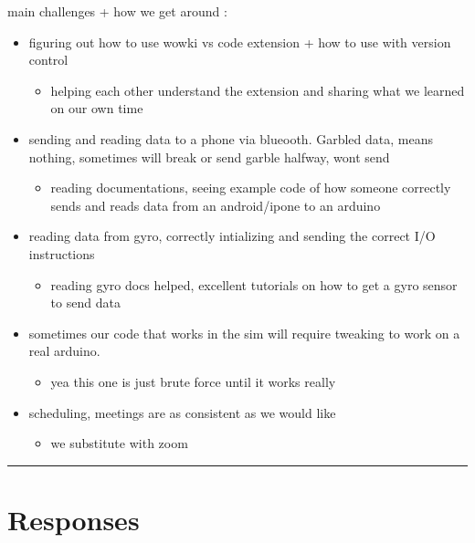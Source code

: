 \documentclass[12pt]{article}
\begin{document}
main challenges + how we get around :
\begin{itemize}
    \item figuring out how to use wowki vs code extension + how to use with version control
      \begin{itemize}
        \item helping each other understand the extension and sharing what we learned on our own time 
      \end{itemize}

    \item sending and reading data to a phone via blueooth. Garbled data, means nothing, sometimes will break or send garble halfway, wont send 
      \begin{itemize}
        \item reading documentations, seeing example code of how someone correctly sends and reads data from an android/ipone to an arduino 
      \end{itemize}

    \item reading data from gyro, correctly intializing and sending the correct I/O instructions 
      \begin{itemize}
        \item reading gyro docs helped, excellent tutorials on how to get a gyro sensor to send data 
      \end{itemize}

    \item sometimes our code that works in the sim will require tweaking to work on a real arduino. 
      \begin{itemize}
        \item yea this one is just brute force until it works really 
      \end{itemize}

    \item scheduling, meetings are as consistent as we would like 
      \begin{itemize}
        \item we substitute with zoom 
      \end{itemize}
\end{itemize}

\vspace{1em}
\hrule
\vspace{1em}

\section*{Responses}
\end{document}

